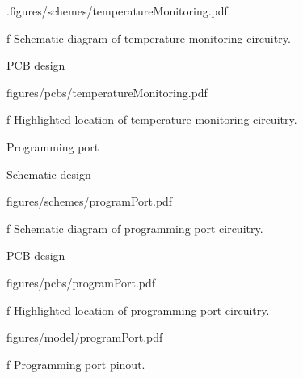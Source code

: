 \midinsert
    .\hsize \cinspic figures/schemes/temperatureMonitoring.pdf
    \caption/f Schematic diagram of temperature monitoring circuitry.
\endinsert

\secc PCB design

\midinsert
    \hsize \cinspic figures/pcbs/temperatureMonitoring.pdf
    \caption/f Highlighted location of temperature monitoring circuitry.
\endinsert




\sec Programming port

\secc Schematic design

\midinsert
    \hsize \cinspic figures/schemes/programPort.pdf
    \caption/f Schematic diagram of programming port circuitry.
\endinsert

\secc PCB design

\midinsert
    \hsize \cinspic figures/pcbs/programPort.pdf
    \caption/f Highlighted location of programming port circuitry.
\endinsert

\midinsert
    \hsize \cinspic figures/model/programPort.pdf
    \caption/f Programming port pinout.
\endinsert
